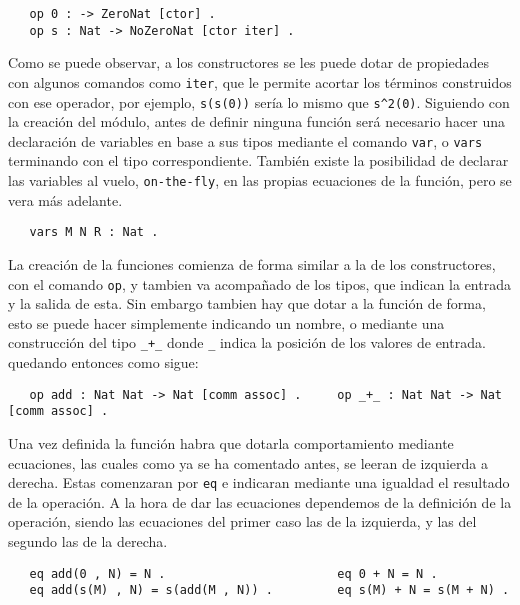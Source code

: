 {\codesize
\begin{verbatim}
   op 0 : -> ZeroNat [ctor] .
   op s : Nat -> NoZeroNat [ctor iter] .
\end{verbatim}
}

Como se puede observar, a los constructores se les puede dotar de propiedades con algunos comandos como \texttt{iter}, que le permite acortar los términos construidos con ese operador, por ejemplo, \verb"s(s(0))" sería lo mismo que \verb"s^2(0)". Siguiendo con la creación del módulo, antes de definir ninguna función será necesario hacer una declaración de variables en base a sus tipos mediante el comando \texttt{var}, o \texttt{vars} terminando con el tipo correspondiente. También existe la posibilidad de declarar las variables al vuelo, \texttt{on-the-fly}, en las propias ecuaciones de la función, pero se vera más adelante. \par

{\codesize
\begin{verbatim}
   vars M N R : Nat .
\end{verbatim}
}

La creación de la funciones comienza de forma similar a la de los constructores, con el comando \texttt{op}, y tambien va acompañado de los tipos, que indican la entrada y la salida de esta. Sin embargo tambien hay que dotar a la función de forma, esto se puede hacer simplemente indicando un nombre, o mediante una construcción del tipo \verb"_+_" donde \verb"_" indica la posición de los valores de entrada. quedando entonces como sigue: \par

{\codesize
\begin{verbatim}
   op add : Nat Nat -> Nat [comm assoc] .     op _+_ : Nat Nat -> Nat [comm assoc] .
\end{verbatim}
}

Una vez definida la función habra que dotarla comportamiento mediante ecuaciones, las cuales como ya se ha comentado antes, se leeran de izquierda a derecha. Estas comenzaran por \texttt{eq} e indicaran mediante una igualdad el resultado de la operación. A la hora de dar las ecuaciones dependemos de la definición de la operación, siendo las ecuaciones del primer caso las de la izquierda, y las del segundo las de la derecha. \par
{\codesize
\begin{verbatim}
   eq add(0 , N) = N .                        eq 0 + N = N .
   eq add(s(M) , N) = s(add(M , N)) .         eq s(M) + N = s(M + N) .
\end{verbatim}
}

